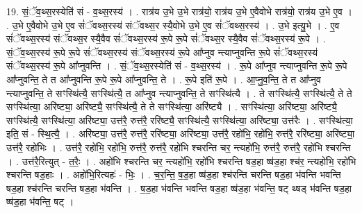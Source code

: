 \documentclass[17pt]{extarticle}
\begin{document}
19. सं॒ॅव॒थ्स॒रस्येति॑ सं - व॒थ्स॒रस्य॑ । . रात्र॑य उ॒भे उ॒भे रात्र॑यो॒ रात्र॑य उ॒भे ए॒वैवोभे रात्र॑यो॒ रात्र॑य उ॒भे ए॒व । . उ॒भे ए॒वैवोभे उ॒भे ए॒व सं॑ॅवथ्स॒रस्य॑ संॅवथ्स॒र स्यै॒वोभे उ॒भे ए॒व सं॑ॅवथ्स॒रस्य॑ । . उ॒भे इत्यु॒भे । . ए॒व सं॑ॅवथ्स॒रस्य॑ संॅवथ्स॒र स्यै॒वैव सं॑ॅवथ्स॒रस्य॑ रू॒पे रू॒पे सं॑ॅवथ्स॒र स्यै॒वैव सं॑ॅवथ्स॒रस्य॑ रू॒पे । . सं॒ॅव॒थ्स॒रस्य॑ रू॒पे रू॒पे सं॑ॅवथ्स॒रस्य॑ संॅवथ्स॒रस्य॑ रू॒पे आ᳚प्नुव न्त्याप्नुवन्ति रू॒पे सं॑ॅवथ्स॒रस्य॑ संॅवथ्स॒रस्य॑ रू॒पे आ᳚प्नुवन्ति । . सं॒ॅव॒थ्स॒रस्येति॑ सं - व॒थ्स॒रस्य॑ । . रू॒पे आ᳚प्नुव न्त्याप्नुवन्ति रू॒पे रू॒पे आ᳚प्नुवन्ति॒ ते त आ᳚प्नुवन्ति रू॒पे रू॒पे आ᳚प्नुवन्ति॒ ते । . रू॒पे इति॑ रू॒पे । . आ॒प्नु॒व॒न्ति॒ ते त आ᳚प्नुव न्त्याप्नुवन्ति॒ ते सꣳस्थि॑त्यै॒ सꣳस्थि॑त्यै॒ त आ᳚प्नुव न्त्याप्नुवन्ति॒ ते सꣳस्थि॑त्यै । . ते सꣳस्थि॑त्यै॒ सꣳस्थि॑त्यै॒ ते ते सꣳस्थि॑त्या॒ अरि॑ष्ट्या॒ अरि॑ष्ट्यै॒ सꣳस्थि॑त्यै॒ ते ते सꣳस्थि॑त्या॒ अरि॑ष्ट्यै । . सꣳस्थि॑त्या॒ अरि॑ष्ट्या॒ अरि॑ष्ट्यै॒ सꣳस्थि॑त्यै॒ सꣳस्थि॑त्या॒ अरि॑ष्ट्या॒ उत्त॑रै॒ रुत्त॑रै॒ ररि॑ष्ट्यै॒ सꣳस्थि॑त्यै॒ सꣳस्थि॑त्या॒ अरि॑ष्ट्या॒ उत्त॑रैः । . सꣳस्थि॑त्या॒ इति॒ सं - स्थि॒त्यै॒ । . अरि॑ष्ट्या॒ उत्त॑रै॒ रुत्त॑रै॒ ररि॑ष्ट्या॒ अरि॑ष्ट्या॒ उत्त॑रै॒ रहो॑भि॒ रहो॑भि॒ रुत्त॑रै॒ ररि॑ष्ट्या॒ अरि॑ष्ट्या॒ उत्त॑रै॒ रहो॑भिः । . उत्त॑रै॒ रहो॑भि॒ रहो॑भि॒ रुत्त॑रै॒ रुत्त॑रै॒ रहो॑भि श्चरन्ति चर॒ न्त्यहो॑भि॒ रुत्त॑रै॒ रुत्त॑रै॒ रहो॑भि श्चरन्ति । . उत्त॑रै॒रित्युत् - त॒रैः॒ । . अहो॑भि श्चरन्ति चर॒ न्त्यहो॑भि॒ रहो॑भि श्चरन्ति षड॒हा ष्ष॑ड॒हा श्च॑र॒ न्त्यहो॑भि॒ रहो॑भि श्चरन्ति षड॒हाः । . अहो॑भि॒रित्यहः॑ - भिः॒ । . च॒र॒न्ति॒ ष॒ड॒हा ष्ष॑ड॒हा श्च॑रन्ति चरन्ति षड॒हा भ॑वन्ति भवन्ति षड॒हा श्च॑रन्ति चरन्ति षड॒हा भ॑वन्ति । . ष॒ड॒हा भ॑वन्ति भवन्ति षड॒हा ष्ष॑ड॒हा भ॑वन्ति॒ षट् थ्षड् भ॑वन्ति षड॒हा ष्ष॑ड॒हा भ॑वन्ति॒ षट् । \newline
\end{document}

